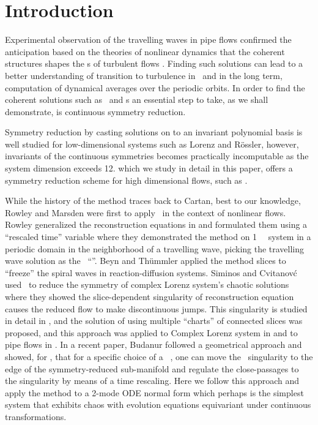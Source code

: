 \section{Introduction}
\label{s:intro}
Experimental observation of the travelling waves in pipe flows  
confirmed the anticipation based on the theories of nonlinear dynamics that 
the coherent structures shapes the \statesp s of turbulent flows . 
Finding such solutions can lead to a better understanding of transition to 
turbulence in \NS\ and in the long term, computation of dynamical averages
over the periodic orbits. In order to find the coherent solutions such as
\reqva\ and \rpo s an essential step to take, as we shall demonstrate, is
continuous symmetry reduction.

Symmetry reduction by casting solutions on to an invariant polynomial basis 
is well studied for low-dimensional systems such as Lorenz 
and R\"{o}ssler, however, invariants of the continuous symmetries becomes 
practically incomputable as the system dimension exceeds 12. 
\Mslices  
{}
which we study in detail in this paper, offers a symmetry reduction scheme
for high dimensional flows, such as \NS .

While the history of the method traces back to Cartan, best  
to our knowledge, Rowley and Marsden were 
first to apply \mslices\ in the context of nonlinear flows. Rowley \etal 
{} generalized the reconstruction equations in 
and formulated them using a ``rescaled time'' variable where they demonstrated 
the method on 1 \dmn\ \KS\ system in a periodic domain in the neighborhood 
of a travelling wave, picking the travelling wave solution as the \slice\ 
``\template ''.  Beyn and Th\"{u}mmler  applied the method 
slices to ``freeze'' the spiral waves in reaction-diffusion systems. Siminos 
and Cvitanov\'{c} \rf{SiCvi10} used \mslices\ to reduce the \SOn{2} symmetry 
of complex Lorenz system's chaotic solutions where they showed the slice-dependent 
singularity of reconstruction equation causes the reduced flow to make discontinuous 
jumps. This singularity is studied in detail in \refref{FrCv11}, and the 
solution of using multiple ``charts'' of connected slices was proposed, 
and this approach was applied to Complex Lorenz system in  
and to pipe flows in \refref{ACHKW11}. In a recent paper, Budanur \etal 
\rf{BudCvi14} followed a geometrical approach and showed, for \SOn{2}, 
that for a specific choice of a \slice\ \template , one can move the \slice\ 
singularity to the edge of the symmetry-reduced sub-manifold and regulate 
the close-passages to the singularity by means of a time rescaling. Here
we follow this approach and apply the method to a 2-mode  ODE normal
form which perhaps is the simplest system that exhibits chaos with evolution
equations equivariant under continuous \SOn{2} transformations.

